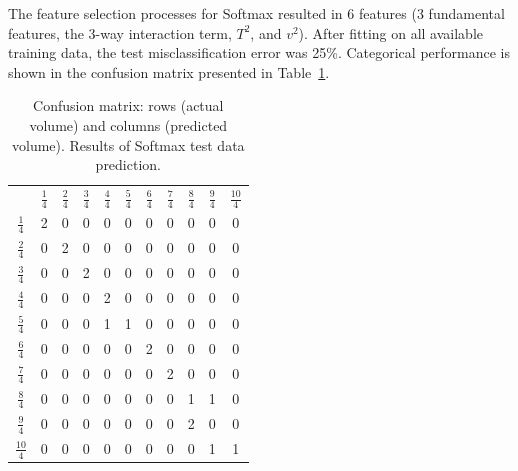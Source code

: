 \documentclass[twocolumn,10pt]{article}
\begin{document}
The feature selection processes for Softmax resulted in 6 features (3 fundamental features, the 3-way interaction term, $T^{2}$, and $v^{2}$).
After fitting on all available training data, the test misclassification error was 25\%. Categorical performance is shown in the confusion matrix presented in Table~\ref{t:confusion}.

\begin{table}
\centering
\begin{tabular}{c|c|c|c|c|c|c|c|c|c|c|}
  \multicolumn{1}{c}{\,} & \multicolumn{1}{c}{$\frac{1}{4}$}& \multicolumn{1}{c}{$\frac{2}{4}$}& \multicolumn{1}{c}{$\frac{3}{4}$}& \multicolumn{1}{c}{$\frac{4}{4}$}& \multicolumn{1}{c}{$\frac{5}{4}$}& \multicolumn{1}{c}{$\frac{6}{4}$}& \multicolumn{1}{c}{$\frac{7}{4}$}& \multicolumn{1}{c}{$\frac{8}{4}$}& \multicolumn{1}{c}{$\frac{9}{4}$}& \multicolumn{1}{c}{$\frac{10}{4}$} \\[1ex] \cline{2-11}
\multicolumn{1}{c|}{\rule{0pt}{3ex} $\frac{1}{4}$} & \cellcolor{blue!50} 2 & 0& 0& 0& 0& 0& 0& 0& 0& 0 \\[0.5ex] \cline{2-11}
\multicolumn{1}{c|}{\rule{0pt}{3ex} $\frac{2}{4}$} & 0 & \cellcolor{blue!50} 2& 0& 0& 0& 0& 0& 0& 0& 0 \\[0.5ex] \cline{2-11}
\multicolumn{1}{c|}{\rule{0pt}{3ex} $\frac{3}{4}$} & 0 & 0& \cellcolor{blue!50} 2& 0& 0& 0& 0& 0& 0& 0 \\[0.5ex] \cline{2-11}
 \multicolumn{1}{c|}{\rule{0pt}{3ex} $\frac{4}{4}$} & 0 & 0& 0& \cellcolor{blue!50} 2& 0& 0& 0& 0& 0& 0 \\[0.5ex] \cline{2-11}
 \multicolumn{1}{c|}{\rule{0pt}{3ex} $\frac{5}{4}$} & 0 & 0& 0& \cellcolor{red!25} 1& \cellcolor{blue!25}1& 0& 0& 0& 0& 0 \\[0.5ex] \cline{2-11}
\multicolumn{1}{c|}{\rule{0pt}{3ex} $\frac{6}{4}$} & 0 & 0& 0& 0& 0& \cellcolor{blue!50} 2& 0& 0& 0& 0 \\[0.5ex] \cline{2-11}
\multicolumn{1}{c|}{\rule{0pt}{3ex} $\frac{7}{4}$} & 0 & 0& 0& 0& 0& 0& \cellcolor{blue!50} 2& 0& 0& 0 \\[0.5ex] \cline{2-11}
\multicolumn{1}{c|}{\rule{0pt}{3ex} $\frac{8}{4}$} & 0 & 0& 0& 0& 0& 0& 0& \cellcolor{blue!25} 1&  \cellcolor{red!25} 1& 0 \\[0.5ex] \cline{2-11}
\multicolumn{1}{c|}{\rule{0pt}{3ex} $\frac{9}{4}$} & 0 & 0& 0& 0& 0& 0& 0&  \cellcolor{red!50} 2& 0& 0 \\[0.5ex] \cline{2-11}
\multicolumn{1}{c|}{\rule{0pt}{3ex} $\frac{10}{4}$} & 0 & 0& 0& 0& 0& 0& 0& 0&  \cellcolor{red!25} 1& \cellcolor{blue!50} 1 \\[0.5ex] \cline{2-11}
  \end{tabular}
  \caption{Confusion matrix: rows (actual volume) and columns (predicted volume). Results of Softmax test data prediction.}
\centering
\label{t:confusion}
\end{table}
\end{document}
